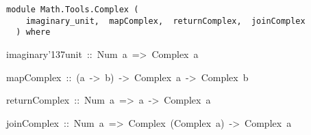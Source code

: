 \label{module:Math.Tools.Complex}
\haddockbeginheader
{\haddockverb\begin{verbatim}
module Math.Tools.Complex (
    imaginary_unit,  mapComplex,  returnComplex,  joinComplex
  ) where\end{verbatim}}
\haddockendheader

\begin{haddockdesc}
\item[
imaginary{\char '137}unit\ ::\ Num\ a\ =>\ Complex\ a
]
\item[
mapComplex\ ::\ (a\ ->\ b)\ ->\ Complex\ a\ ->\ Complex\ b
]
\item[
returnComplex\ ::\ Num\ a\ =>\ a\ ->\ Complex\ a
]
\item[
joinComplex\ ::\ Num\ a\ =>\ Complex\ (Complex\ a)\ ->\ Complex\ a
]
\end{haddockdesc}